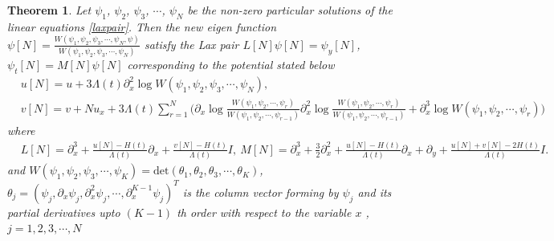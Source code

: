 \documentclass{article}%
\newtheorem{theorem}{Theorem}
\begin{document}
\begin{theorem}
	Let $\psi_{1}$, $\psi_{2}$, $\psi_{3}$, $\cdots$, $\psi_{N}$ be the non-zero particular solutions of the linear equations \eqref{laxpair}. Then the new eigen function  $\psi[N]=\frac{W(\psi_{1},\psi_{2},\psi_{3},\cdots,\psi_{N},\psi)}{W(\psi_{1},\psi_{2},\psi_{3},\cdots,\psi_{N})}$ satisfy the Lax pair  $L[N]\psi[N]=\psi_y[N] $,\quad $\psi_t[N]=M[N]\psi[N]$ corresponding to the potential stated below
\begin{equation}
\begin{split}
&u[N]=u+3\Lambda(t)\partial^{2}_{x}\log W(\psi_{1},\psi_{2},\psi_{3},\cdots,\psi_{N}),\\
&v[N]=v+Nu_x+3\Lambda(t)\sum_{r=1}^{N}\bigg(\partial_x\log \frac{W(\psi_1,\psi_2,\cdots,\psi_r)}{W(\psi_1,\psi_2,\cdots,\psi_{r-1})}\partial^{2}_x\log\frac{W(\psi_1,\psi_2,\cdots,\psi_r)}{W(\psi_1,\psi_2,\cdots,\psi_{r-1})}+\partial^{3}_x\log W(\psi_1,\psi_2,\cdots,\psi_r)\bigg)\label{Nsol}
\end{split}
\end{equation}
where
\begin{equation}
\begin{split}
&L[N]=\partial_x^3+\frac{u[N]-H(t)}{\Lambda(t)}\partial_x+\frac{v[N]-H(t)}{\Lambda(t)}I,~ M[N]=\partial_x^3+\frac{3}{2}\partial^2_x+\frac{u[N]-H(t)}{\Lambda(t)}\partial_x+\partial_y+\frac{u[N]+v[N]-2H(t)}{\Lambda(t)}I.
\end{split}
\end{equation}
and 	$W(\psi_{1},\psi_{2},\psi_{3},\cdots,\psi_{K})=\text{det}(\theta_1, \theta_2, \theta_3,\cdots, \theta_K)$, $\theta_j=(\psi_j,\partial_{x}\psi_j,\partial^2_{x}\psi_j,\cdots,\partial^{K-1}_{x}\psi_j)^T$ is the column vector forming by $\psi_j$ and its partial derivatives upto $(K-1)$ th order with respect to the variable $x$ , $j=1,2,3,\cdots, N$
\end{theorem}
\end{document}
